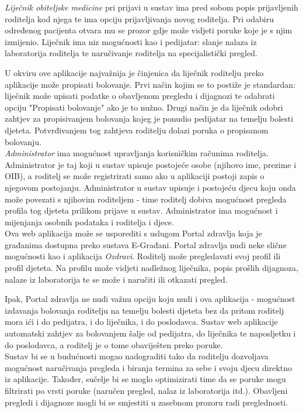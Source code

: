 		
		\textit{Liječnik obiteljske medicine} pri prijavi u sustav ima pred sobom popis prijavljenih roditelja kod njega te ima opciju prijavljivanja novog roditelja. Pri odabiru određenog pacijenta otvara mu se prozor gdje može vidjeti poruke koje je s njim izmijenio. Liječnik ima niz mogućnosti kao i pedijatar: slanje nalaza iz laboratorija roditelja te naručivanje roditelja na specijalistički pregled. 
		
		U okviru ove aplikacije najvažnija je činjenica da liječnik roditelju preko aplikacije može propisati bolovanje. Prvi način kojim se to postiže je standardan: liječnik može upisati podatke o obavljenom pregledu i dijagnozi te odabrati opciju "Propisati bolovanje" ako je to nužno. Drugi način je da liječnik odobri zahtjev za propisivanjem bolovanja kojeg je ponudio pedijatar na temelju bolesti djeteta. Potvrđivanjem tog zahtjeva roditelju dolazi poruka o propisanom bolovanju. \\
		
		
		\textit{Administrator} ima mogućnost upravljanja korisničkim računima roditelja. Administrator je taj koji u sustav upisuje postojeće osobe (njihovo ime, prezime i OIB), a roditelj se može registrirati samo ako u aplikaciji postoji zapis o njegovom postojanju. Administrator u sustav upisuje i postojeću djecu koju onda može povezati s njihovim roditeljem - time roditelj dobiva mogućnost pregleda profila tog djeteta prilikom prijave u sustav. Administrator ima mogućnost i mijenjanja osobnih podataka i roditelja i djece.\\
		
		
		Ova web aplikacija može se usporediti s uslugom Portal zdravlja koja je građanima dostupna preko sustava E-Građani. Portal zdravlja nudi neke slične mogućnosti kao i aplikacija \textit{Ozdravi}. Roditelj može pregledavati svoj profil ili profil djeteta. Na profilu može vidjeti nadležnog liječnika, popis prošlih dijagnoza, nalaze iz laboratorija te se može i naručiti ili otkazati pregled.
		 
		Ipak, Portal zdravlja ne nudi važnu opciju koju nudi i ova aplikacija - mogućnost izdavanja bolovanja roditelju na temelju bolesti djeteta bez da pritom roditelj mora ići i do pedijatra, i do liječnika, i do poslodavca. Sustav web aplikacije automatski zahtjev za bolovanjem šalje od pedijatra, do liječnika te naposljetku i do poslodavca, a roditelj je o tome obaviješten preko poruke.\\
		
		
		Sustav bi se u budućnosti mogao nadograditi tako da roditelju dozvoljava mogućnost naručivanja pregleda i biranja termina za sebe i svoju djecu direktno iz aplikacije. Također, sučelje bi se moglo optimizirati time da se poruke mogu filtrirati po vrsti poruke (naručen pregled, nalaz iz laboratorija itd.). Obavljeni pregledi i dijagnoze mogli bi se smjestiti u zasebnom prozoru radi preglednosti. 
		
